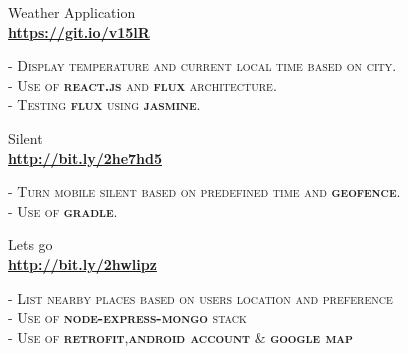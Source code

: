 \documentclass[10pt]{article} %
\begin{document}
{\begin{minipage}[t]{0.5\textwidth}


{\raggedright\large Weather Application \\
	\textbf{\href {https://github.com/Bitaron/js/tree/weather}{https://git.io/v15lR}}\\[5pt]}
\textsc{- Display temperature and current local time based on city.}\\
\textsc{- Use of \textbf{react.js} and \textbf{flux} architecture.}\\
\textsc{- Testing \textbf{flux} using \textbf{jasmine}.}\\




{\raggedright\large Silent \\
	\textbf{\href {https://dl.dropboxusercontent.com/u/84146203/projects/android/silent.apk}{http://bit.ly/2he7hd5}}\\[5pt]}
\textsc{- Turn mobile silent based on predefined time and \textbf{geofence}.}\\
\textsc{- Use of \textbf{gradle}.}\\




{\raggedright\large Lets go \\
	\textbf{\href {https://dl.dropboxusercontent.com/u/84146203/projects/android/letsgo.apk}{http://bit.ly/2hwlipz}}\\[5pt]}
\textsc{- List nearby places based on users location and preference}\\
\textsc{- Use of \textbf{node-express-mongo} stack}\\
\textsc{- Use of \textbf{retrofit},\textbf{android account} \& \textbf{google map}}\\



\end{minipage} %
\hfill
\begin{minipage}[t]{0.44\textwidth} %
\vspace{0pt} %



\end{minipage}}
\end{document}
